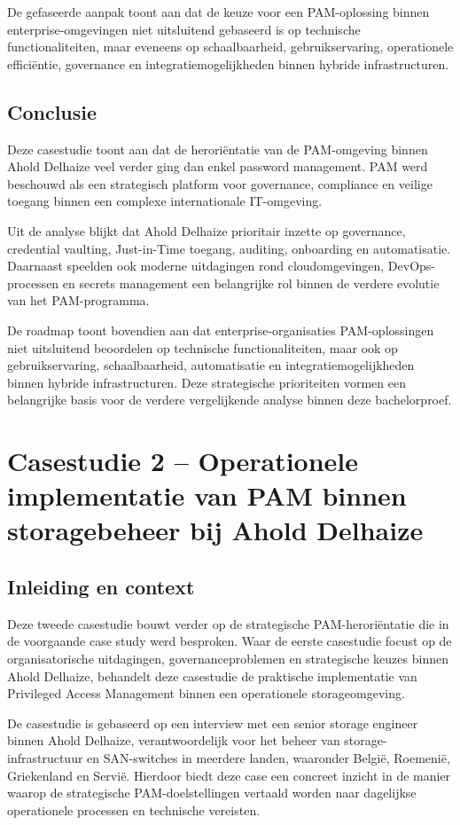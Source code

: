 De gefaseerde aanpak toont aan dat de keuze voor een PAM-oplossing binnen enterprise-omgevingen niet uitsluitend gebaseerd is op technische functionaliteiten, maar eveneens op schaalbaarheid, gebruikservaring, operationele efficiëntie, governance en integratiemogelijkheden binnen hybride infrastructuren.

\subsection{Conclusie}

Deze casestudie toont aan dat de heroriëntatie van de PAM-omgeving binnen Ahold Delhaize veel verder ging dan enkel password management. PAM werd beschouwd als een strategisch platform voor governance, compliance en veilige toegang binnen een complexe internationale IT-omgeving.

Uit de analyse blijkt dat Ahold Delhaize prioritair inzette op governance, credential vaulting, Just-in-Time toegang, auditing, onboarding en automatisatie. Daarnaast speelden ook moderne uitdagingen rond cloudomgevingen, DevOps-processen en secrets management een belangrijke rol binnen de verdere evolutie van het PAM-programma.

De roadmap toont bovendien aan dat enterprise-organisaties PAM-oplossingen niet uitsluitend beoordelen op technische functionaliteiten, maar ook op gebruikservaring, schaalbaarheid, automatisatie en integratiemogelijkheden binnen hybride infrastructuren. Deze strategische prioriteiten vormen een belangrijke basis voor de verdere vergelijkende analyse binnen deze bachelorproef.

\section{Casestudie 2 – Operationele implementatie van PAM binnen storagebeheer bij Ahold Delhaize}
\subsection{Inleiding en context}
Deze tweede casestudie bouwt verder op de strategische PAM-heroriëntatie die in de voorgaande case study werd besproken. Waar de eerste casestudie focust op de organisatorische uitdagingen, governanceproblemen en strategische keuzes binnen Ahold Delhaize, behandelt deze casestudie de praktische implementatie van Privileged Access Management binnen een operationele storageomgeving.

De casestudie is gebaseerd op een interview met een senior storage engineer binnen Ahold Delhaize, verantwoordelijk voor het beheer van storage-infrastructuur en SAN-switches in meerdere landen, waaronder België, Roemenië, Griekenland en Servië. Hierdoor biedt deze case een concreet inzicht in de manier waarop de strategische PAM-doelstellingen vertaald worden naar dagelijkse operationele processen en technische vereisten. 

